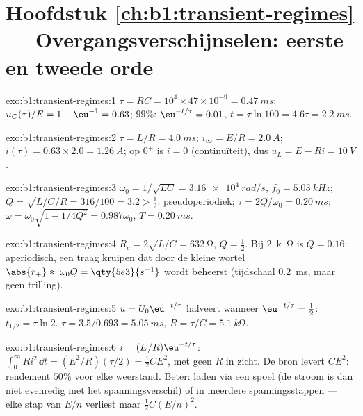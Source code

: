 \section*{Hoofdstuk \ref{ch:b1:transient-regimes} --- Overgangsverschijnselen: eerste en tweede orde}

\begin{solution}{exo:b1:transient-regimes:1}
$\tau = RC = 10^4 \times 47\times10^{-9} = \qty{0.47}{ms}$; $u_C(\tau)/E
= 1 - \eu^{-1} = 0.63$; $99\%$: $\eu^{-t/\tau} = 0.01$, $t = \tau\ln 100
= 4.6\tau = \qty{2.2}{ms}$.
\end{solution}

\begin{solution}{exo:b1:transient-regimes:2}
$\tau = L/R = \qty{4.0}{ms}$; $i_\infty = E/R = \qty{2.0}{A}$; $i(\tau) =
0.63 \times 2.0 = \qty{1.26}{A}$; op $0^+$ is $i = 0$ (continuïteit), dus
$u_L = E - Ri = \qty{10}{V}$.
\end{solution}

\begin{solution}{exo:b1:transient-regimes:3}
$\omega_0 = 1/\sqrt{LC} = \qty{3.16e4}{rad/s}$, $f_0 = \qty{5.03}{kHz}$;
$Q = \sqrt{L/C}/R = 316/100 = 3.2 > \tfrac12$: pseudoperiodiek;
$\tau = 2Q/\omega_0 = \qty{0.20}{ms}$; $\omega = \omega_0\sqrt{1 - 1/4Q^2}
= 0.987\omega_0$, $T = \qty{0.20}{ms}$.
\end{solution}

\begin{solution}{exo:b1:transient-regimes:4}
$R_c = 2\sqrt{L/C} = \qty{632}{\ohm}$, $Q = \tfrac12$. Bij \qty{2}{k\ohm} is
$Q = 0.16$: aperiodisch, een traag kruipen dat door de kleine wortel
$\abs{r_+} \approx \omega_0 Q = \qty{5e3}{s^{-1}}$ wordt beheerst (tijdschaal
\qty{0.2}{ms}, maar geen trilling).
\end{solution}

\begin{solution}{exo:b1:transient-regimes:5}
$u = U_0\eu^{-t/\tau}$ halveert wanneer $\eu^{-t/\tau} = \tfrac12$: $t_{1/2}
= \tau\ln 2$. $\tau = 3.5/0.693 = \qty{5.05}{ms}$, $R = \tau/C =
\qty{5.1}{k\ohm}$.
\end{solution}

\begin{solution}{exo:b1:transient-regimes:6}
$i = (E/R)\eu^{-t/\tau}$: $\int_0^\infty Ri^2\,\dd t = (E^2/R)(\tau/2) =
\tfrac12 CE^2$, met geen $R$ in zicht. De bron levert $CE^2$: rendement
$50\%$ voor elke weerstand. Beter: laden via een spoel (de
stroom is dan niet evenredig met het spanningsverschil) of in meerdere
spanningsstappen --- elke stap van $E/n$ verliest maar $\tfrac12 C(E/n)^2$.
\end{solution}

